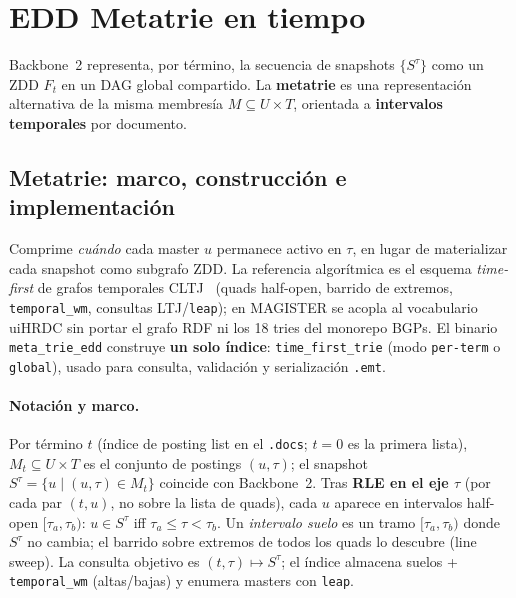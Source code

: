 
\section{EDD Metatrie en tiempo}
\label{sec:metatrie}

Backbone~2 representa, por término, la secuencia de snapshots $\{S^\tau\}$ como un
ZDD $F_t$ en un DAG global compartido. La \textbf{metatrie} es una representación
alternativa de la misma membresía $M\subseteq U\times T$, orientada a
\textbf{intervalos temporales} por documento.

\subsection{Metatrie: marco, construcción e implementación}
\label{subsec:metatrie-impl}

Comprime \emph{cuándo} cada master $u$ permanece activo en $\tau$, en lugar de
materializar cada snapshot como subgrafo ZDD.
La referencia algorítmica es el esquema \emph{time-first} de grafos temporales
CLTJ~\cite{Arroyuelo2026TemporalBGPs} (quads half-open, barrido de extremos,
\texttt{temporal\_wm}, consultas LTJ/\texttt{leap}); en MAGISTER se acopla al
vocabulario uiHRDC sin portar el grafo RDF ni los 18 tries del monorepo BGPs.
El binario \texttt{meta\_trie\_edd} construye \textbf{un solo índice}:
\texttt{time\_first\_trie} (modo \texttt{per-term} o \texttt{global}), usado para
consulta, validación y serialización \texttt{.emt}.

\paragraph{Notación y marco.}
Por término $t$ (índice de posting list en el \texttt{.docs}; $t=0$ es la primera lista),
$M_t\subseteq U\times T$ es el conjunto de postings $(u,\tau)$; el snapshot
$S^\tau=\{u\mid(u,\tau)\in M_t\}$ coincide con Backbone~2.
Tras \textbf{RLE en el eje $\tau$} (por cada par $(t,u)$, no sobre la lista de quads),
cada $u$ aparece en intervalos half-open $[\tau_a,\tau_b)$: $u\in S^\tau$ iff
$\tau_a\le\tau<\tau_b$.
Un \emph{intervalo suelo} es un tramo $[\tau_a,\tau_b)$ donde $S^\tau$ no cambia;
el barrido sobre extremos de todos los quads lo descubre (line sweep).
La consulta objetivo es $(t,\tau)\mapsto S^\tau$; el índice almacena suelos +
\texttt{temporal\_wm} (altas/bajas) y enumera masters con \texttt{leap}.

